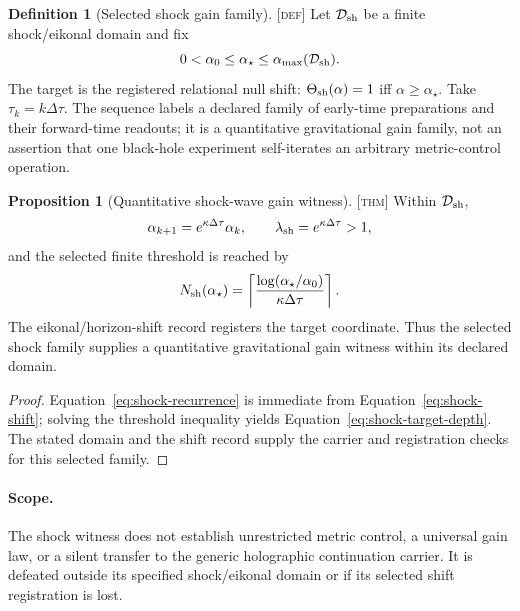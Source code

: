 \documentclass[11pt]{article}
\newcommand{\Defn}{\textsc{[def]}}
\newcommand{\Thm}{\textsc{[thm]}}
\theoremstyle{definition}
\newtheorem{sdefinition}{Definition}
\newtheorem{sproposition}{Proposition}
\begin{document}
\begin{sdefinition}[Selected shock gain family]
\label{def:selected-shock-realization}
\Defn{} Let $\mathcal D_{\rm sh}$ be a finite shock/eikonal domain and fix
\begin{equation}
0<\alpha_0\le\alpha_\star\le\alpha_{\max}(\mathcal D_{\rm sh}).
\label{eq:shock-target-domain}
\end{equation}
The target is the registered relational null shift:
$\Theta_{\rm sh}(\alpha)=1$ iff $\alpha\ge\alpha_\star$.  Take
$\tau_k=k\Delta\tau$.  The sequence labels a declared family of early-time
preparations and their forward-time readouts; it is a quantitative gravitational
gain family, not an assertion that one black-hole experiment self-iterates an
arbitrary metric-control operation.
\end{sdefinition}

\begin{sproposition}[Quantitative shock-wave gain witness]
\label{prop:shock-wave-gain-realization}
\Thm{} Within $\mathcal D_{\rm sh}$,
\begin{equation}
\alpha_{k+1}=e^{\kappa\Delta\tau}\alpha_k,
\qquad \lambda_{\rm sh}=e^{\kappa\Delta\tau}>1,
\label{eq:shock-recurrence}
\end{equation}
and the selected finite threshold is reached by
\begin{equation}
N_{\rm sh}(\alpha_\star)=
\left\lceil\frac{\log(\alpha_\star/\alpha_0)}{\kappa\Delta\tau}\right\rceil.
\label{eq:shock-target-depth}
\end{equation}
The eikonal/horizon-shift record registers the target coordinate.  Thus the
selected shock family supplies a quantitative gravitational gain witness within
its declared domain.
\end{sproposition}

\begin{proof}
Equation~\eqref{eq:shock-recurrence} is immediate from
Equation~\eqref{eq:shock-shift}; solving the threshold inequality yields
Equation~\eqref{eq:shock-target-depth}.  The stated domain and the shift record
supply the carrier and registration checks for this selected family.
\end{proof}

\paragraph{Scope.}
The shock witness does not establish unrestricted metric control, a universal
gain law, or a silent transfer to the generic holographic continuation carrier.
It is defeated outside its specified shock/eikonal domain or if its selected
shift registration is lost.
\end{document}
